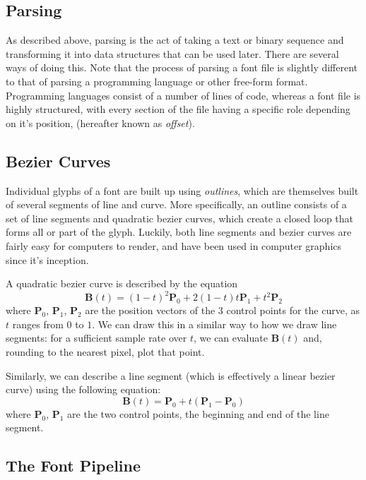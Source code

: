 \documentclass{report}
\begin{document}
\subsection{Parsing}
As described above, parsing is the act of taking a text or binary sequence and
transforming it into data structures that can be used later. There are several
ways of doing this. Note that the process of parsing a font file is slightly
different to that of parsing a programming language or other free-form format.
Programming languages consist of a number of lines of code, whereas a font file
is highly structured, with every section of the file having a specific role
depending on it's position, (hereafter known as \textit{offset}).

\subsection{Bezier Curves}
Individual glyphs of a font are built up using \textit{outlines}, which are
themselves built of several segments of line and curve. More specifically, an
outline consists of a set of line segments and quadratic bezier curves, which
create a closed loop that forms all or part of the glyph. Luckily, both line
segments and bezier curves are fairly easy for computers to render, and have
been used in computer graphics since it's inception.

A quadratic bezier curve is described by the equation
\begin{equation*}
\mathbf{B}(t) = (1 - t)^2\mathbf{P}_0 +2(1 - t)t\mathbf{P}_1 + t^2\mathbf{P}_2
\end{equation*}
where $\mathbf{P}_0$, $\mathbf{P}_1$, $\mathbf{P}_2$ are the position vectors of
the 3 control points for the curve, as $t$ ranges from $0$ to $1$. We can draw
this in a similar way to how we draw line segments: for a sufficient sample rate
over $t$, we can evaluate $\mathbf{B}(t)$ and, rounding to the nearest pixel,
plot that point.

Similarly, we can describe a line segment (which is effectively a linear bezier
curve) using the following equation:
\begin{equation*}
  \mathbf{B}(t) = \mathbf{P}_0 + t(\mathbf{P}_1 - \mathbf{P}_0)
\end{equation*}
where $\mathbf{P}_0$, $\mathbf{P}_1$ are the two control points, the beginning
and end of the line segment. 

\subsection{The Font Pipeline}
\end{document}

